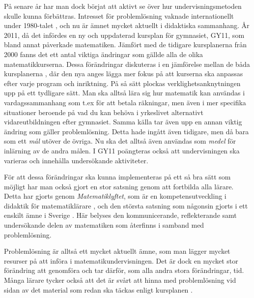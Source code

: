 \textcolor{lila}{På senare år har man dock börjat att aktivt se över hur undervisningsmetoden skulle kunna förbättras. Intresset för problemlösning vaknade internationellt under 1980-talet \cite{80-talet}, och nu är ämnet mycket aktuellt i didaktiska sammanhang. År 2011, då det infördes en ny och uppdaterad kursplan för gymnasiet, GY11, som bland annat påverkade matematiken. Jämfört med de tidigare kursplanerna från 2000 fanns det ett antal viktiga ändringar som gällde alla de olika matematikkurserna. 
Dessa förändringar diskuteras i en jämförelse mellan de båda kursplanerna \cite{GY00-GY11}, där den nya anges lägga mer fokus på att kurserna ska anpassas efter varje program och inriktning. På så sätt plockas verklighetsanknytningen upp på ett tydligare sätt. Man ska alltså lära sig hur matematik kan användas i vardagssammanhang som t.ex för att betala räkningar, men även i mer specifika situationer beroende på vad du kan behöva i yrkeslivet alternativt vidareutbildningen efter gymnasiet. 
Samma källa tar även upp en annan viktig ändring som gäller problemlösning. Detta hade ingått även tidigare, men då bara som ett \textsl{mål} utöver de övriga. Nu ska det alltså även användas som \textsl{medel} för inlärning av de andra målen. I GY11 poängteras också att undervisningen ska varieras och innehålla undersökande aktiviteter.}

\textcolor{lila}{För att dessa förändringar ska kunna implementeras på ett så bra sätt som möjligt har man också gjort en stor satsning genom att fortbilda alla lärare. Detta har gjorts genom \textsl{Matematiklyftet}, som är en kompetensutveckling i didaktik för matematiklärare \cite{Namnaren}, och den största satsning som någonsin gjorts i ett enskilt ämne i Sverige \cite{mattelyftet}. Här belyses den kommunicerande, reflekterande samt undersökande delen av matematiken som återfinns i samband med problemlösning.}
            
\textcolor{lila}{Problemlösning är alltså ett mycket aktuellt ämne, som man lägger mycket resurser på att införa i matematikundervisningen. Det är dock en mycket stor förändring att genomföra och tar därför, som alla andra stora förändringar, tid. Många lärare tycker också att det är svårt att hinna med problemlösning vid sidan av det material som redan ska täckas enligt kursplanen \cite{2016Senare}.}


